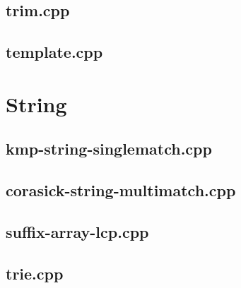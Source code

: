\documentclass[10pt,twocolumn,landscape]{article}
\begin{document}
\subsection{trim.cpp}


\subsection{template.cpp}


\section{String}

\subsection{kmp-string-singlematch.cpp}


\subsection{corasick-string-multimatch.cpp}


\subsection{suffix-array-lcp.cpp}


\subsection{trie.cpp}

\end{document}
